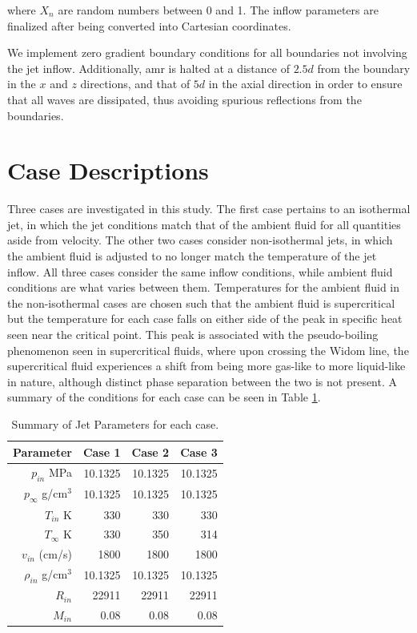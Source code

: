 \noindent where $X_n$ are random numbers between 0 and 1. The inflow parameters are finalized after being converted into Cartesian coordinates.

We implement zero gradient boundary conditions for all boundaries not involving the jet inflow. Additionally, \gls{amr} is halted at a distance of $2.5d$ from the boundary in the $x$ and $z$ directions, and that of $5d$ in the axial direction in order to ensure that all waves are dissipated, thus avoiding spurious reflections from the boundaries. 

\section{Case Descriptions}
Three cases are investigated in this study. The first case pertains to an isothermal jet, in which the jet conditions match that of the ambient fluid for all quantities aside from velocity. The other two cases consider non-isothermal jets, in which the ambient fluid is adjusted to no longer match the temperature of the jet inflow. All three cases consider the same inflow conditions, while ambient fluid conditions are what varies between them. Temperatures for the ambient fluid in the non-isothermal cases are chosen such that the ambient fluid is supercritical but the temperature for each case falls on either side of the peak in specific heat seen near the critical point. This peak is associated with the pseudo-boiling phenomenon seen in supercritical fluids, where upon crossing the Widom line, the supercritical fluid experiences a shift from being more gas-like to more liquid-like in nature, although distinct phase separation between the two is not present. A summary of the conditions for each case can be seen in Table \ref{Case-Params}.
\begin{table}[H]
\caption{Summary of Jet Parameters for each case.}
\label{Case-Params}
\begin{center}
\begin{tabular}{ r || r r r  }
Parameter &Case 1 & Case 2 & Case 3 \\
\hline
$p_{in}$ MPa& 10.1325 &10.1325 & 10.1325 \\
$p_{\infty}$ g/cm$^3$& 10.1325 & 10.1325 & 10.1325 \\
$T_{in}$ K& 330 & 330 & 330 \\
$T_{\infty}$ K& 330& 350 & 314  \\
$v_{in}$ (cm/s)& 1800 & 1800 & 1800  \\
$\rho_{in}$ g/cm$^3$& 10.1325 & 10.1325 & 10.1325 \\
$R_{in}$ & 22911 & 22911 & 22911  \\
$M_{in}$ & 0.08 & 0.08 & 0.08  \\
\end{tabular}
\end{center}
\end{table}


